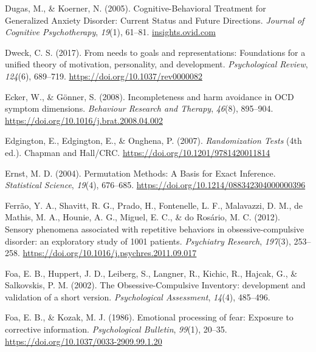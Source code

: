 \documentclass[
  man,floatsintext]{apa7}
\newlength{\cslhangindent}
\newlength{\cslentryspacingunit} %
\newenvironment{CSLReferences}[2] %
 {%
  \setlength{\parindent}{0pt}
  \ifodd #1
  \let\oldpar\par
  \def\par{\hangindent=\cslhangindent\oldpar}
  \fi
  \setlength{\parskip}{#2\cslentryspacingunit}
 }%
 {}
\begin{document}
\begin{CSLReferences}{1}{0}
\leavevmode{}%
Dugas, M., \& Koerner, N. (2005). Cognitive-Behavioral Treatment for Generalized Anxiety Disorder: Current Status and Future Directions. \emph{Journal of Cognitive Psychotherapy}, \emph{19}(1), 61--81. \href{https://insights.ovid.com}{insights.ovid.com}

\leavevmode{}%
Dweck, C. S. (2017). From needs to goals and representations: Foundations for a unified theory of motivation, personality, and development. \emph{Psychological Review}, \emph{124}(6), 689--719. \url{https://doi.org/10.1037/rev0000082}

\leavevmode{}%
Ecker, W., \& Gönner, S. (2008). Incompleteness and harm avoidance in OCD symptom dimensions. \emph{Behaviour Research and Therapy}, \emph{46}(8), 895--904. \url{https://doi.org/10.1016/j.brat.2008.04.002}

\leavevmode{}%
Edgington, E., Edgington, E., \& Onghena, P. (2007). \emph{Randomization Tests} (4th ed.). Chapman and Hall/CRC. \url{https://doi.org/10.1201/9781420011814}

\leavevmode{}%
Ernst, M. D. (2004). Permutation Methods: A Basis for Exact Inference. \emph{Statistical Science}, \emph{19}(4), 676--685. \url{https://doi.org/10.1214/088342304000000396}

\leavevmode{}%
Ferrão, Y. A., Shavitt, R. G., Prado, H., Fontenelle, L. F., Malavazzi, D. M., de Mathis, M. A., Hounie, A. G., Miguel, E. C., \& do Rosário, M. C. (2012). Sensory phenomena associated with repetitive behaviors in obsessive-compulsive disorder: an exploratory study of 1001 patients. \emph{Psychiatry Research}, \emph{197}(3), 253--258. \url{https://doi.org/10.1016/j.psychres.2011.09.017}

\leavevmode{}%
Foa, E. B., Huppert, J. D., Leiberg, S., Langner, R., Kichic, R., Hajcak, G., \& Salkovskis, P. M. (2002). The Obsessive-Compulsive Inventory: development and validation of a short version. \emph{Psychological Assessment}, \emph{14}(4), 485--496.

\leavevmode{}%
Foa, E. B., \& Kozak, M. J. (1986). Emotional processing of fear: Exposure to corrective information. \emph{Psychological Bulletin}, \emph{99}(1), 20--35. \url{https://doi.org/10.1037/0033-2909.99.1.20}


\end{CSLReferences}
\end{document}
